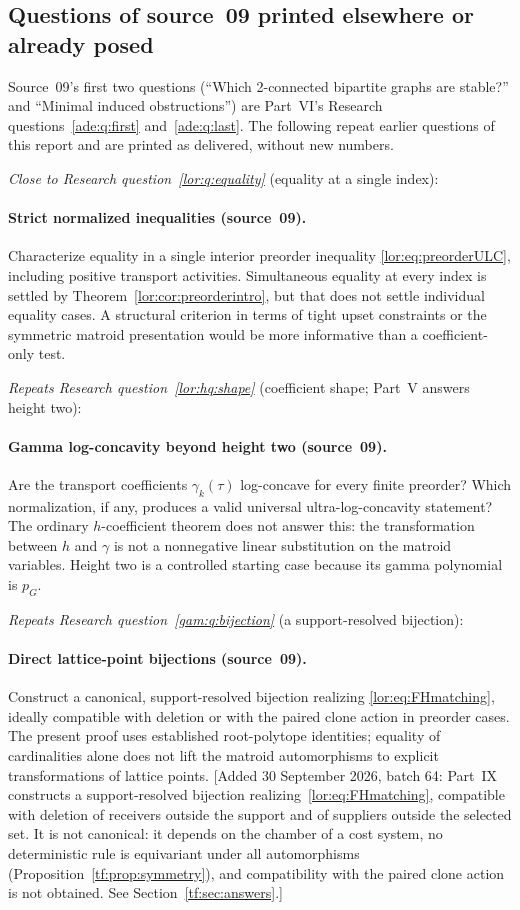 \documentclass[11pt]{article}
\numberwithin{equation}{section}
\theoremstyle{definition}
\begin{document}
\subsection{Questions of source~09 printed elsewhere or already posed}
\label{mat:sec:oldquestions}
Source~09's first two questions (``Which 2-connected bipartite graphs are
stable?'' and ``Minimal induced obstructions'') are Part~VI's Research
questions~\ref{ade:q:first} and~\ref{ade:q:last}. The following repeat
earlier questions of this report and are printed as delivered, without new
numbers.

\noindent\emph{Close to Research question~\ref{lor:q:equality}}
(equality at a single index):
\paragraph{Strict normalized inequalities (source~09).}
Characterize equality in a single interior preorder inequality
\eqref{lor:eq:preorderULC}, including positive transport activities. Simultaneous
equality at every index is settled by Theorem~\ref{lor:cor:preorderintro}, but
that does not settle individual equality cases. A structural criterion in
terms of tight upset constraints or the symmetric matroid presentation
would be more informative than a coefficient-only test.


\noindent\emph{Repeats Research question~\ref{lor:hq:shape}} (coefficient
shape; Part~V answers height two):
\paragraph{Gamma log-concavity beyond height two (source~09).}
Are the transport coefficients $\gamma_k(\tau)$ log-concave for every
finite preorder? Which normalization, if any, produces a valid universal
ultra-log-concavity statement? The ordinary $h$-coefficient theorem does
not answer this: the transformation between $h$ and $\gamma$ is not a
nonnegative linear substitution on the matroid variables. Height two is a
controlled starting case because its gamma polynomial is $p_G$.


\noindent\emph{Repeats Research question~\ref{gam:q:bijection}} (a
support-resolved bijection):
\paragraph{Direct lattice-point bijections (source~09).}
Construct a canonical, support-resolved bijection realizing
\eqref{lor:eq:FHmatching}, ideally compatible with deletion or with the
paired clone action in preorder cases. The present proof uses established
root-polytope identities; equality of cardinalities alone does not lift the
matroid automorphisms to explicit transformations of lattice points.
[Added 30 September 2026, batch 64: Part~IX constructs a
support-resolved bijection realizing~\eqref{lor:eq:FHmatching}, compatible
with deletion of receivers outside the support and of suppliers outside
the selected set. It is not canonical: it depends on the chamber of a
cost system, no deterministic rule is equivariant under all automorphisms
(Proposition~\ref{tf:prop:symmetry}), and compatibility with the paired
clone action is not obtained. See Section~\ref{tf:sec:answers}.]
\end{document}
